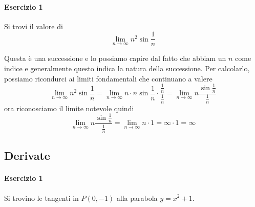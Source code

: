\paragraph{Esercizio 1}
Si trovi il valore di
\begin{equation*}
  \lim\limits_{n \to \infty} n^2\sin \frac{1}{n}
\end{equation*}
\divisor

Questa è una successione e lo possiamo capire dal fatto che abbiam un $n$ come indice e 
generalmente questo indica la natura della successione. Per calcolarlo, possiamo ricondurci ai
limiti fondamentali che continuano a valere
\begin{equation*}
  \lim\limits_{n \to \infty} n^2\sin \frac{1}{n} = 
  \lim\limits_{n \to \infty} n\cdot n\sin \frac{1}{n}\cdot \frac{\frac{1}{n}}{\frac{1}{n}} =
  \lim\limits_{n \to \infty} n \frac{\sin \frac{1}{n}}{\frac{1}{n}}
\end{equation*}
ora riconosciamo il limite notevole quindi
\begin{equation*}
  \lim\limits_{n \to \infty} n \frac{\sin \frac{1}{n}}{\frac{1}{n}} =
  \lim\limits_{n \to \infty} n\cdot1 = \infty\cdot1=\boxed{\infty}
\end{equation*}

\subsection*{Derivate}\label{sub:derivate}

\paragraph{Esercizio 1}
Si trovino le tangenti in $P(0,-1)$ alla parabola $y=x^2+1$.
\divisor

